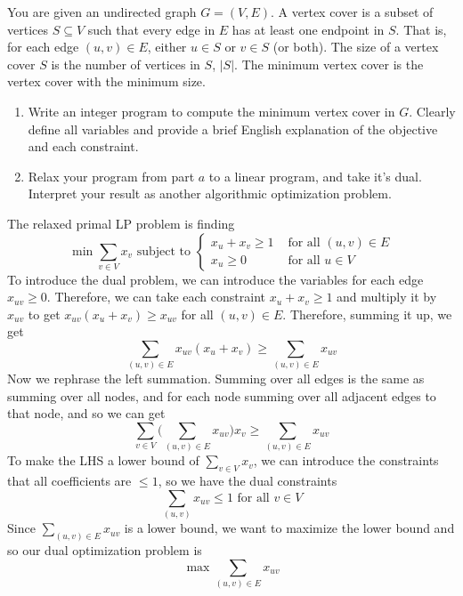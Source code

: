   \begin{example}
    You are given an undirected graph $G = (V, E)$. A vertex cover is a subset of vertices $S \subseteq V$ such that every edge in $E$ has at least one endpoint in $S$. That is, for each edge $(u, v) \in E$, either $u \in S$ or $v \in S$ (or both). The size of a vertex cover $S$ is the number of vertices in $S$, $|S|$. The minimum vertex cover is the vertex cover with the minimum size.
    \begin{enumerate}
      \item Write an integer program to compute the minimum vertex cover in $G$.  Clearly define all variables and provide a brief English explanation of the objective and each constraint.
      \item Relax your program from part $a$ to a linear program, and take it's dual. Interpret your result as another algorithmic optimization problem.
    \end{enumerate} 

    The relaxed primal LP problem is finding 
    \begin{equation}
      \min \sum_{v \in V} x_v \text{ subject to } \begin{cases} 
        x_u + x_v \geq 1 & \text{ for all } (u, v) \in E \\
        x_u \geq 0 & \text{ for all } u \in V
      \end{cases}
    \end{equation}
    To introduce the dual problem, we can introduce the variables for each edge $x_{uv} \geq 0$. Therefore, we can take each constraint $x_u + x_v \geq 1$ and multiply it by $x_{uv}$ to get $x_{uv} (x_u + x_v) \geq x_{uv}$ for all $(u, v) \in E$. Therefore, summing it up, we get 
    \begin{equation}
      \sum_{(u, v) \in E} x_{uv} (x_u + x_v) \geq \sum_{(u, v) \in E} x_{uv}
    \end{equation}
    Now we rephrase the left summation. Summing over all edges is the same as summing over all nodes, and for each node summing over all adjacent edges to that node, and so we can get 
    \begin{equation}
      \sum_{v \in V} \bigg( \sum_{(u, v) \in E} x_{uv} \bigg) x_v \geq \sum_{(u, v) \in E} x_{uv} 
    \end{equation}
    To make the LHS a lower bound of $\sum_{v \in V} x_v$, we can introduce the constraints that all coefficients are $\leq 1$, so we have the dual constraints 
    \begin{equation}
      \sum_{(u, v)} x_{uv} \leq 1 \text{ for all } v \in V
    \end{equation}
    Since $\sum_{(u, v) \in E} x_{uv}$ is a lower bound, we want to maximize the lower bound and so our dual optimization problem is 
    \begin{equation}
      \max \sum_{(u, v) \in E} x_{uv}
    \end{equation}
  \end{example}
